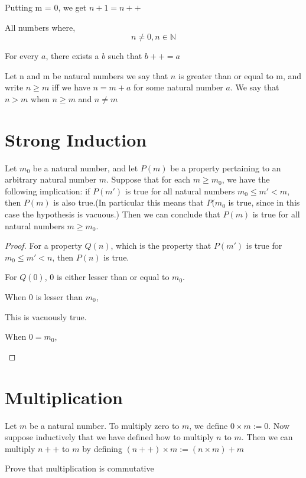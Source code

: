 \documentclass[11pt]{report}
\begin{document}
Putting m = 0, we get \(n+1 = n++\)
\begin{definition}
All numbers where,
\[
n \neq 0, n \in \mathbb{N}
\]
\end{definition}

\begin{lemma}
For every $a$, there exists a $b$ such that $b++ = a$
\end{lemma}

\begin{definition}[Order]
Let n and m be natural numbers we say that $n$ is greater than or equal to m, and write $n \geq m$ iff we have $n = m + a$ for some natural number $a$. We say that $n > m$ when $n \geq m$ and $n \neq m$
\end{definition}
\section{Strong Induction}
\label{sec:orge725f7a}
\begin{theorem}
Let \(m_0\) be a natural number, and let \(P(m)\) be a property pertaining to an arbitrary natural number \(m\). Suppose that for each \(m \geq m_0\), we have the following implication: if \(P(m')\) is true for all natural numbers \(m_0 \leq m' < m\), then \(P(m)\) is also true.(In particular this means that \(P(m_0\) is true, since in this case the hypothesis is vacuous.) Then we can conclude that \(P(m)\) is true for all natural numbers \(m \geq m_0\).
\end{theorem}
\begin{proof}
For a property \(Q(n)\), which is the property that \(P(m')\) is true for \(m_0 \leq m' < n\), then \(P(n)\) is true.

\begin{centering}
For $Q(0)$,
$0$ is either lesser than or equal to $m_0$.

When $0$ is lesser than $m_0$,

This is vacuously true.

When $0 = m_0$,
\end{centering}
\end{proof}
\section{Multiplication}
\label{sec:org002004e}
\begin{definition}
Let \(m\) be a natural number. To multiply zero to \(m\), we define \(0 \times m := 0\). Now suppose inductively that we have defined how to multiply \(n\) to \(m\). Then we can multiply \(n++\) to \(m\) by defining \((n++) \times m := (n \times m) + m\)
\end{definition}
\begin{lemma}
Prove that multiplication is commutative
\end{lemma}
\end{document}
